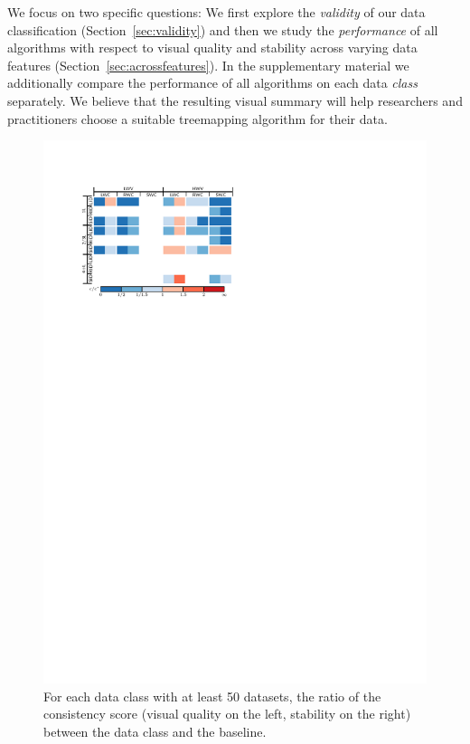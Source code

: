 We focus on two specific questions: We first explore the \emph{validity} of our data classification (Section~\ref{sec:validity}) and then we study the \emph{performance} of all algorithms with respect to visual quality and stability across varying data features (Section~\ref{sec:acrossfeatures}).
In the supplementary material we additionally compare the performance of all algorithms on each data \emph{class} separately. We believe that the resulting visual summary will help researchers and practitioners choose a suitable treemapping algorithm for their data.

\begin{figure}[]
    \centering
    \includegraphics{figures/treemap-evaluation/VarianceTable}
    \caption{For each data class with at least 50 datasets, the ratio of the consistency score (visual quality on the left, stability on the right) between the data class and the baseline. }
    \label{fig:variancetable}
\end{figure}

